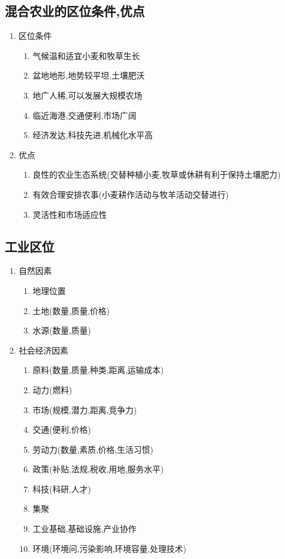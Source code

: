 \documentclass[a4paper]{article}
\begin{document}
    \subsection{混合农业的区位条件,优点}
    \begin{enumerate}
        \item 区位条件
        \begin{enumerate}
            \item 气候温和适宜小麦和牧草生长
            \item 盆地地形,地势较平坦,土壤肥沃
            \item 地广人稀,可以发展大规模农场
            \item 临近海港,交通便利,市场广阔
            \item 经济发达,科技先进,机械化水平高
        \end{enumerate}
        \item 优点
        \begin{enumerate}
            \item 良性的农业生态系统(交替种植小麦,牧草或休耕有利于保持土壤肥力)
            \item 有效合理安排农事(小麦耕作活动与牧羊活动交替进行)
            \item 灵活性和市场适应性
        \end{enumerate}
    \end{enumerate}
    \subsection{工业区位}
    \begin{enumerate}
        \item 自然因素
        \begin{enumerate}
            \item 地理位置
            \item 土地(数量,质量,价格)
            \item 水源(数量,质量)
        \end{enumerate}
        \item 社会经济因素
        \begin{enumerate}
            \item 原料(数量,质量,种类,距离,运输成本)
            \item 动力(燃料)
            \item 市场(规模,潜力,距离,竞争力)
            \item 交通(便利,价格)
            \item 劳动力(数量,素质,价格,生活习惯)
            \item 政策(补贴,法规,税收,用地,服务水平)
            \item 科技(科研,人才)
            \item 集聚
            \item 工业基础,基础设施,产业协作
            \item 环境(环境问,污染影响,环境容量,处理技术)
        \end{enumerate}
    \end{enumerate}
\end{document}
